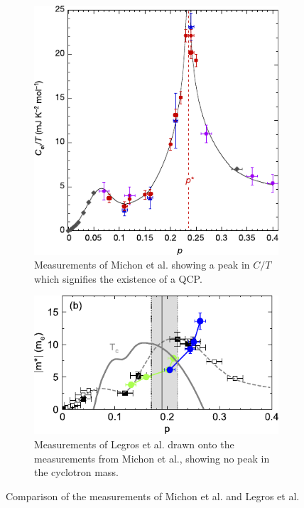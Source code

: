 \begin{figure}
    \centering
    \begin{subfigure}{0.48\textwidth}
        \centering
        \includegraphics[width=\textwidth]{figures/michon}
        \caption{Measurements of Michon et al. showing a peak in $C/T$ which signifies the existence
            of a QCP.}
        \label{fig:michon}
    \end{subfigure}\hfill
    \begin{subfigure}{0.48\textwidth}
        \centering
        \includegraphics[width=\textwidth]{figures/legros}
        \caption{Measurements of Legros et al. drawn onto the measurements from Michon et al.,
            showing no peak in the cyclotron mass.}
        \label{fig:michon}
    \end{subfigure}
    \caption{Comparison of the measurements of Michon et al. and Legros et al.}
    \label{fig:comparison}
\end{figure}


